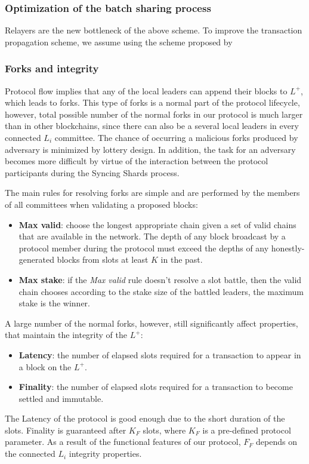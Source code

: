 \subsubsection{Optimization of the batch sharing process}
Relayers are the new bottleneck of the above scheme.
To improve the transaction propagation scheme, we assume using the scheme proposed by

\subsubsection{Forks and integrity}\label{subsec:resolving-forks}

Protocol flow implies that any of the local leaders can append their blocks to $L^+$, which leads to forks.
This type of forks is a normal part of the protocol lifecycle, however, total possible number of the normal forks in our protocol is much larger than in other blockchains, since there can also be a several local leaders in every connected $L_i$ committee.
The chance of occurring a malicious forks produced by adversary is minimized by lottery design.
In addition, the task for an adversary becomes more difficult by virtue of the interaction between the protocol participants during the Syncing Shards process.

The main rules for resolving forks are simple and are performed by the members of all committees when validating a proposed blocks:
\begin{itemize}
    \item \textbf{Max valid}: choose the longest appropriate chain given a set of valid chains that are available in the network.
    The depth of any block broadcast by a protocol member during the protocol must exceed the depths of any honestly-generated blocks from slots at least $K$ in the past.
    \item \textbf{Max stake}: if the \emph{Max valid} rule doesn't resolve a slot battle, then the valid chain chooses according to the stake size of the battled leaders, the maximum stake is the winner.
\end{itemize}

A large number of the normal forks, however, still significantly affect properties, that maintain the integrity of the $L^+$:
\begin{itemize}
    \item \textbf{Latency}: the number of elapsed slots required for a transaction to appear in a block on the $L^+$.
    \item \textbf{Finality}: the number of elapsed slots required for a transaction to become settled and immutable.
\end{itemize}
The Latency of the protocol is good enough due to the short duration of the slots.
Finality is guaranteed after $K_F$ slots, where $K_F$ is a pre-defined protocol parameter.
As a result of the functional features of our protocol, $F_F$ depends on the connected $L_i$ integrity properties.

